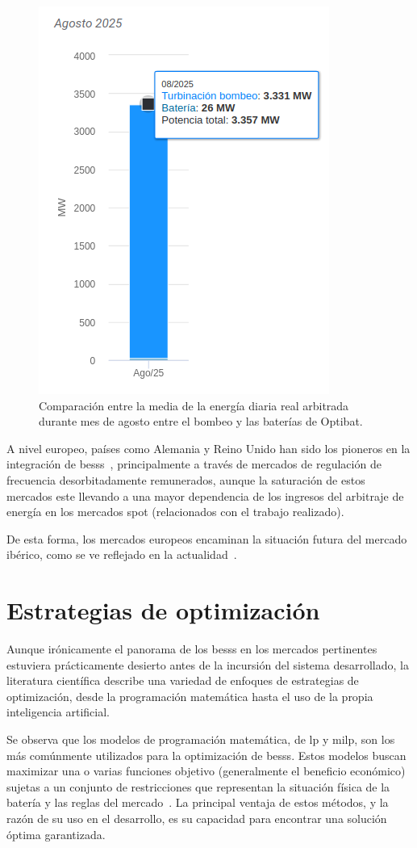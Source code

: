 \begin{figure}
  \centering
  \includegraphics[width=0.4\linewidth]{figures/comparacion-energia-ciclada.png}
  \caption{Comparación entre la media de la energía diaria real arbitrada durante mes de agosto entre el bombeo y las baterías de Optibat.}
  \label{fig:comparacion-energia-ciclada}
\end{figure}

A nivel europeo, países como Alemania y Reino Unido han sido los pioneros en la integración de \glspl{bess}~\cite{kivipelto2017grid, tejada2019review}, principalmente a través de mercados de regulación de frecuencia desorbitadamente remunerados, aunque la saturación de estos mercados este llevando a una mayor dependencia de los ingresos del arbitraje de energía en los mercados spot (relacionados con el trabajo realizado).

De esta forma, los mercados europeos encaminan la situación futura del mercado ibérico, como se ve reflejado en la actualidad~\cite{kumar2019strategic}.

\section{Estrategias de optimización}
\label{makereference2.2}

Aunque irónicamente el panorama de los \glspl{bess} en los mercados pertinentes estuviera prácticamente desierto antes de la incursión del sistema desarrollado, la literatura científica describe una variedad de enfoques de estrategias de optimización, desde la programación matemática hasta el uso de la propia inteligencia artificial.

Se observa que los modelos de programación matemática, de \gls{lp} y \gls{milp}, son los más comúnmente utilizados para la optimización de \glspl{bess}. Estos modelos buscan maximizar una o varias funciones objetivo (generalmente el beneficio económico) sujetas a un conjunto de restricciones que representan la situación física de la batería y las reglas del mercado~\cite{mendoza2023review}. La principal ventaja de estos métodos, y la razón de su uso en el desarrollo, es su capacidad para encontrar una solución óptima garantizada.


